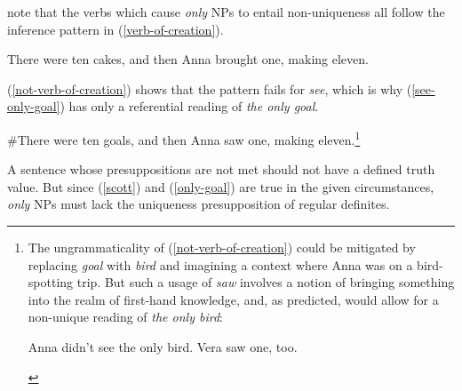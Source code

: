 \citet{cb2015} note that the verbs which cause \textit{only} NPs to entail non-uniqueness all follow the inference pattern in (\ref{verb-of-creation}).

\begin{exe}
	\ex \label{verb-of-creation} There were ten cakes, and then Anna brought one, making eleven.
\end{exe}
	
(\ref{not-verb-of-creation}) shows that the pattern fails for \textit{see}, which is why (\ref{see-only-goal}) has only a referential reading of \textit{the only goal}.

\begin{exe}
	\ex \label{not-verb-of-creation} \#There were ten goals, and then Anna saw one, making eleven.\footnote{The ungrammaticality of (\ref{not-verb-of-creation}) could be mitigated by replacing \textit{goal} with \textit{bird} and imagining a context where Anna was on a bird-spotting trip. But such a usage of \textit{saw} involves a notion of bringing something into the realm of first-hand knowledge, and, as predicted, would allow for a non-unique reading of \textit{the only bird}: \begin{exe} \ex Anna didn't see the only bird. Vera saw one, too. \end{exe} }
\end{exe}

A sentence whose presuppositions are not met should not have a defined truth value. But since (\ref{scott}) and (\ref{only-goal}) are true in the given circumstances, \textit{only} NPs must lack the uniqueness presupposition of regular definites.